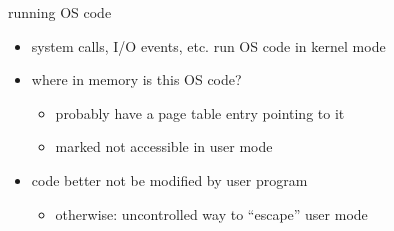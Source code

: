 \begin{frame}{running OS code}
    \begin{itemize}
    \item system calls, I/O events, etc. run OS code in kernel mode
    \vspace{.5cm}
    \item<2-> where in memory is this OS code?
        \begin{itemize}
            \item<3-> probably have a page table entry pointing to it
            \item<3-> marked not accessible in user mode
        \end{itemize}
    \item<4-> code better not be modified by user program
        \begin{itemize}
        \item otherwise: uncontrolled way to ``escape'' user mode
        \end{itemize}
    \end{itemize}
\end{frame}

